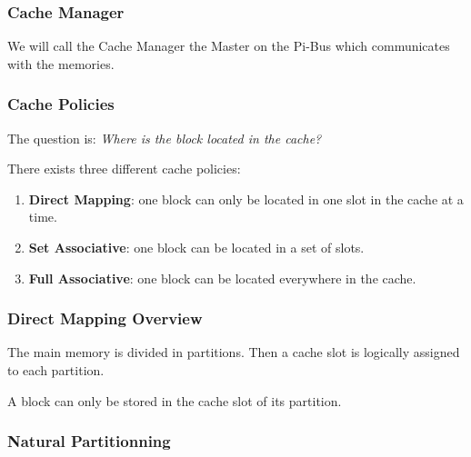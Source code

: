 
\begin{frame}
  \frametitle{Cache Manager}

  We will call the Cache Manager the Master on the Pi-Bus which communicates
  with the memories.

  \begin{center}
  \end{center}
\end{frame}


\begin{frame}
  \frametitle{Cache Policies}

  The question is: \textit{Where is the block located in the cache?}

  \-

  There exists three different cache policies:

  \begin{enumerate}[<+->]
    \item
      \textbf{Direct Mapping}: one block can only be located in one
      slot in the cache at a time.
    \item
      \textbf{Set Associative}: one block can be located in a set of
      slots.
    \item
      \textbf{Full Associative}: one block can be located everywhere
      in the cache.
  \end{enumerate}
\end{frame}


\begin{frame}
  \frametitle{Direct Mapping Overview}

  The main memory is divided in partitions. Then a cache slot is
  logically assigned to each partition.

  \-

  A block can only be stored in the cache slot of its partition.
\end{frame}


\begin{frame}
  \frametitle{Natural Partitionning}

  \begin{center}
  \end{center}
\end{frame}



